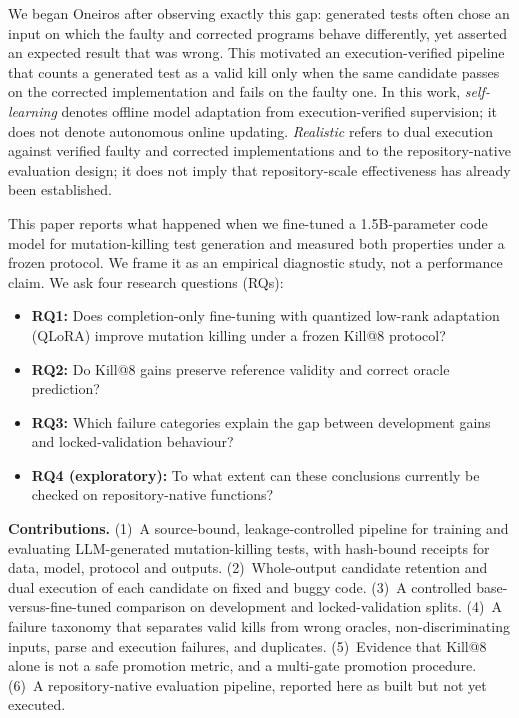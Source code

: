 \documentclass[10pt,conference,letterpaper]{IEEEtran}
\makeatletter
\newcommand{\killk}[1]{Kill@#1}
\makeatother
\begin{document}
We began Oneiros after observing exactly this gap: generated tests often chose an
input on which the faulty and corrected programs behave differently, yet asserted an
expected result that was wrong. This motivated an execution-verified pipeline that
counts a generated test as a valid kill only when the same candidate passes on the
corrected implementation and fails on the faulty one. In this work, \emph{self-learning}
denotes offline model adaptation from execution-verified supervision; it does not
denote autonomous online updating. \emph{Realistic} refers to dual execution against
verified faulty and corrected implementations and to the repository-native evaluation
design; it does not imply that repository-scale effectiveness has already been
established.

This paper reports what happened when we fine-tuned a 1.5B-parameter code model for
mutation-killing test generation and measured both properties under a frozen
protocol. We frame it as an empirical diagnostic study, not a performance claim. We
ask four research questions (RQs):

\begin{itemize}
\item \textbf{RQ1:} Does completion-only fine-tuning with quantized low-rank
adaptation (QLoRA) improve mutation killing under a frozen \killk{8} protocol?
\item \textbf{RQ2:} Do \killk{8} gains preserve reference validity and correct
oracle prediction?
\item \textbf{RQ3:} Which failure categories explain the gap between development
gains and locked-validation behaviour?
\item \textbf{RQ4 (exploratory):} To what extent can these conclusions currently be
checked on repository-native functions?
\end{itemize}

\textbf{Contributions.} (1)~A source-bound, leakage-controlled pipeline for training
and evaluating LLM-generated mutation-killing tests, with hash-bound receipts for data,
model, protocol and outputs. (2)~Whole-output candidate retention and dual execution
of each candidate on fixed and buggy code. (3)~A controlled base-versus-fine-tuned
comparison on development and locked-validation splits. (4)~A failure taxonomy that
separates valid kills from wrong oracles, non-discriminating inputs, parse and
execution failures, and duplicates. (5)~Evidence that \killk{8} alone is not a safe
promotion metric, and a multi-gate promotion procedure. (6)~A repository-native
evaluation pipeline, reported here as built but not yet executed.
\end{document}
